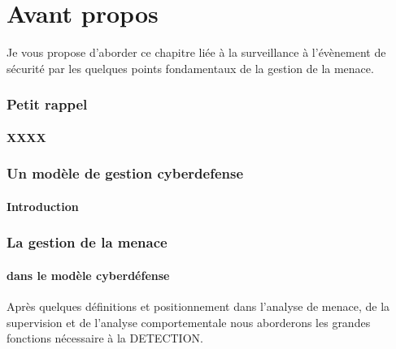 

\section{Avant propos}

Je vous propose d'aborder ce chapitre liée à la surveillance à l'évènement de sécurité par les quelques points fondamentaux de la gestion de la menace.

\begin{frame}
\frametitle<presentation>{Petit rappel}
\framesubtitle<presentation>{XXXX}

\end{frame}


\begin{frame}
\frametitle<presentation>{Un modèle de gestion cyberdefense}
\framesubtitle<presentation>{Introduction}
\end{frame}

\begin{frame}
\frametitle<presentation>{La gestion de la menace}
\framesubtitle<presentation>{dans le modèle cyberdéfense}
\end{frame}

Après quelques définitions et positionnement dans l'analyse de menace,  de la supervision et de l'analyse comportementale nous aborderons les grandes fonctions nécessaire à la DETECTION.

